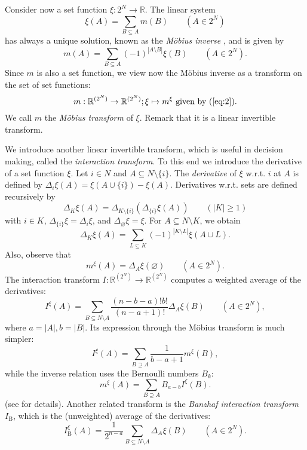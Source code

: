 \documentclass[12pt,a4paper]{article}
\theoremstyle{definition}
\theoremstyle{remark}
\def \RR {\mathbb{R}}
\begin{document}
Consider now a set function $\xi:2^N\rightarrow \RR$. The linear system
\begin{equation}\label{eq:1}
\xi(A) = \sum_{B\subseteq A}m(B) \qquad (A\in 2^N)
\end{equation}
has always a unique solution, known as the \textit{M\"obius inverse}
\cite{rot64}, and is given by
\begin{equation}\label{eq:2}
m(A) = \sum_{B\subseteq A}(-1)^{|A\setminus B|}\xi(B) \qquad (A\in 2^N).
\end{equation}
Since $m$ is also a set function, we view now the M\"obius inverse as a transform on
the set of set functions:
\[
m:\RR^{(2^N)}\rightarrow \RR^{(2^N)}; \xi\mapsto m^\xi\text{ given by (\ref{eq:2})}.
\]
We call $m$ the \textit{M\"obius transform} of $\xi $. Remark that it is a linear invertible
transform.

We introduce another linear invertible transform, which is useful in decision
making, called the \textit{interaction transform}. To this end we introduce the
derivative of a set function $\xi$. Let $i\in N$ and $A\subseteq N\setminus\{i\}$. The
\textit{derivative} of $\xi$ w.r.t. $i$ at $A$ is defined by $\Delta_i\xi(A) =
\xi(A\cup \{i\}) - \xi(A)$. Derivatives w.r.t. sets are defined recursively by
\[
\Delta_K\xi(A) = \Delta_{K\setminus \{i\}}(\Delta_{\{i\}}\xi(A)) \qquad
(|K|\geqslant 1)
\]
with $i\in K$, $\Delta_{\{i\}}\xi=\Delta_i\xi$, and
$\Delta_\varnothing\xi=\xi$. For $A\subseteq N\setminus K$, we obtain
\[
\Delta_K\xi(A) = \sum_{L\subseteq K}(-1)^{|K\setminus L|}\xi(A\cup L).
\]
 Also, observe that 
\begin{equation}\label{eq:md}
m^\xi(A) = \Delta_A\xi(\varnothing) \qquad (A\in 2^N).
\end{equation}
The interaction transform $I:\RR^{(2^N)}\rightarrow \RR^{(2^N)}$ computes a weighted
average of the derivatives:
\begin{equation}\label{eq:3}
I^\xi(A) = \sum_{B\subseteq N\setminus
  A}\frac{(n-b-a)!b!}{(n-a+1)!}\Delta_A\xi(B) \qquad (A\in 2^N),
\end{equation}
where $a=|A|, b=|B|$. Its expression through the M\"obius transform is much
simpler:
\begin{equation}\label{eq:4}
I^\xi(A) = \sum_{B\supseteq A}\frac{1}{b-a+1}m^\xi(B),
\end{equation}
while the inverse relation uses the Bernoulli numbers $B_k$:
\[
m^\xi(A) = \sum_{B\supseteq A}B_{a-b}I^\xi(B).
\]
(see \cite{degr96,grmaro99a} for details). Another related transform is the
\textit{Banzhaf interaction transform} $I_{\mathrm{B}}$, which is the
(unweighted) average of the derivatives:
\begin{equation}\label{eq:3b}
I^\xi_{\mathrm{B}}(A) = \frac{1}{2^{n-a}}\sum_{B\subseteq N\setminus
  A}\Delta_A\xi(B) \qquad (A\in 2^N).
\end{equation}
\end{document}
